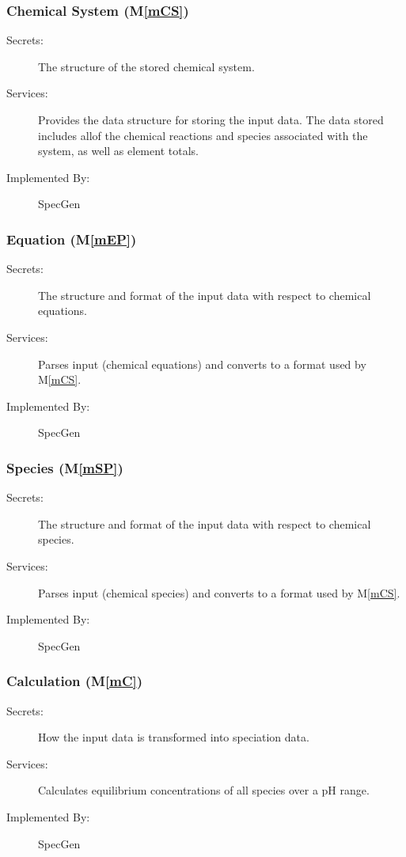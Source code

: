 \documentclass[12pt, titlepage]{article}
\newcommand{\mref}[1]{M\ref{#1}}
\newcommand{\progname}{SpecGen}
\begin{document}
\subsubsection{Chemical System (\mref{mCS})}

\begin{description}
\item[Secrets:]The structure of the stored chemical system.
\item[Services:]Provides the data structure for storing the input data.
The data stored includes allof the chemical reactions and species associated 
with the system, as well as element totals.
\item[Implemented By:] \progname{}
\end{description}

\subsubsection{Equation (\mref{mEP})}

\begin{description}
\item[Secrets:]The structure and format of the input data with respect to 
chemical equations.
\item[Services:]Parses input (chemical equations) and converts to a format
  used by \mref{mCS}.
\item[Implemented By:] \progname{}
\end{description}

\subsubsection{Species (\mref{mSP})}

\begin{description}
\item[Secrets:]The structure and format of the input data with respect to 
chemical species.
\item[Services:]Parses input (chemical species) and converts to a format
  used by \mref{mCS}.
\item[Implemented By:] \progname{}
\end{description}

\subsubsection{Calculation (\mref{mC})}

\begin{description}
\item[Secrets:]How the input data is transformed into speciation data.
\item[Services:]Calculates equilibrium concentrations of all species over
  a pH range.
\item[Implemented By:] \progname{}
\end{description}
\end{document}
